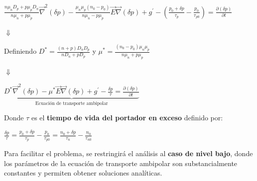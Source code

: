 \documentclass[oneside]{book}
\numberwithin{equation}{section}
\numberwithin{figure}{section}
\numberwithin{table}{section}
\begin{document}
			\begin{center}
				$\displaystyle \frac{n\mu_n D_p+p\mu_p D_n}{n\mu_n+p\mu_p}\vec{\nabla}^2(\delta p)-\frac{\mu_n \mu_p (n_0-p_0)}{n\mu_n-p\mu_p}\vec{E}\vec{\nabla} (\delta p)+g^\prime -\left(\frac{p_0+\delta p}{\tau_p}-\frac{p_0}{\tau_{p0}}\right)=\frac{\partial (\delta p)}{\partial t}$
			\end{center}
			\begin{center}	
				$\Downarrow$
			\end{center}
			\begin{center}
				Definiendo $\displaystyle D^*=\frac{(n+p)D_nD_p}{nD_n+pD_p}$ y $\displaystyle \mu^*=\frac{(n_0-p_0)\mu_n\mu_p}{n\mu_n+p\mu_p}$\\
			\end{center}
			\begin{center}	
				$\Downarrow$
			\end{center}
			\begin{center}
				$\underbrace{\displaystyle D^*\vec{\nabla}^2(\delta p)-\mu^*\vec{E}\vec{\nabla} (\delta p)+g^\prime -\frac{\delta p}{\tau}=\frac{\partial (\delta p)}{\partial t}}_{\text{Ecuación de transporte ambipolar}}$
			\end{center}	
			\begin{center}
			Donde $\tau$ es el \textbf{tiempo de vida del portador en exceso} definido por:
			\end{center}
			\begin{center}
				 $\displaystyle \frac{\delta p}{\tau}=\frac{p_0+\delta p}{\tau_p}-\frac{p_0}{\tau_{p0}}=\frac{n_0+\delta p}{\tau_n}-\frac{n_0}{\tau_{n0}}$
			\end{center}
	
			Para facilitar el problema, se restringirá el análisis al \textbf{caso de nivel bajo}, donde los parámetros de la ecuación de transporte ambipolar son substancialmente constantes y permiten obtener soluciones analíticas.\\
			
\end{document}
